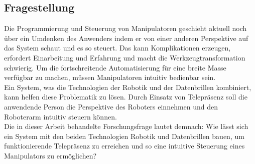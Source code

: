 \subsection{Fragestellung}
  Die Programmierung und Steuerung von Manipulatoren geschieht aktuell noch über ein Umdenken des Anwenders indem er von einer anderen Perspektive auf das System schaut und es so steuert. Das kann Komplikationen erzeugen, erfordert Einarbeitung und Erfahrung und macht die Werkzeugtransformation schwierig. Um die fortschreitende Automatisierung für eine breite Masse verfügbar zu machen, müssen Manipulatoren intuitiv bedienbar sein. \\
  Ein System, was die Technologien der Robotik und der Datenbrillen kombiniert, kann helfen diese Problematik zu lösen. Durch Einsatz von Telepräsenz soll die anwendende Person die Perspektive des Roboters einnehmen und den Roboterarm intuitiv steuern können. \\
  Die in dieser Arbeit behandelte Forschungsfrage lautet demnach:
  Wie lässt sich ein System mit den beiden Technologien Robotik und Datenbrillen bauen, um funktionierende Telepräsenz zu erreichen und so eine intuitive Steuerung eines Manipulators zu ermöglichen?
